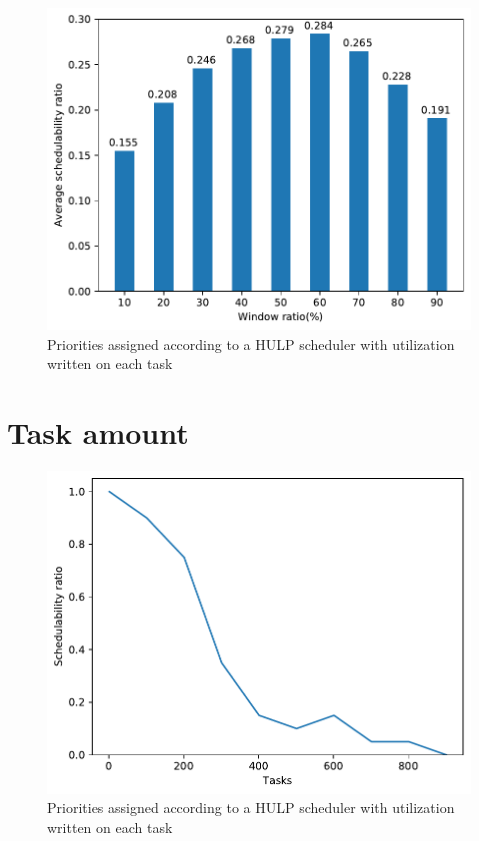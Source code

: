 \documentclass{kththesis}
\begin{document}
\begin{figure}

    \centering

    \includegraphics[width=1.0\linewidth]{images/window_ratio_averages.pdf}

    \caption{Priorities assigned according to a HULP scheduler with utilization written on each task}

    \label{fig:window_ratio_averages}

\end{figure}

\section{Task amount}

\begin{figure}

    \centering

    \includegraphics[width=1.0\linewidth]{images/task_amount_2.pdf}

    \caption{Priorities assigned according to a HULP scheduler with utilization written on each task}

    \label{fig:task_amount_2}

\end{figure}
\end{document}
